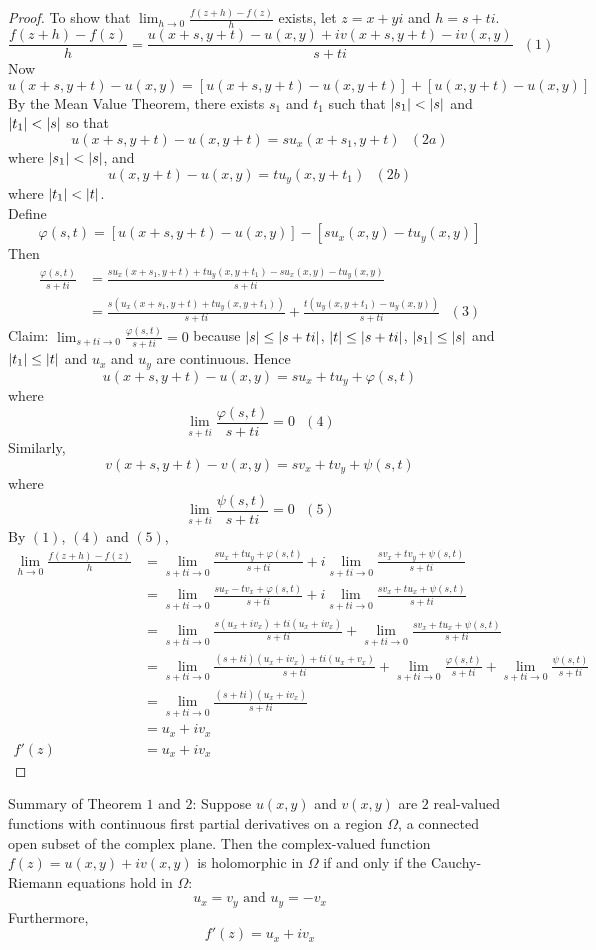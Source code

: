 \documentclass[12pt]{article}
\begin{document}
\begin{proof} To show that $\lim_{h\to 0} \frac{f(z+h) - f(z)}{h}$ exists, let $z =x+yi$ and $h=s+ti$. 
$$ \frac{f(z+h) - f(z)}{h} = \frac{u(x+s, y+t) - u(x,y) + iv(x+s,y+t) - iv(x,y)}{s+ti} ~~~(1)$$ 
Now $$ u(x+s,y+t) - u(x,y) = [u(x+s,y+t) - u(x,y+t)] + [u(x,y+t) - u(x,y)] $$ 
By the Mean Value Theorem, there exists $s_1$ and $t_1$ such that $\abs{s_1} < \abs{s}$ and $\abs{t_1} < \abs{s}$ so that 
$$u(x+s,y+t) - u(x,y+t) = su_x(x+s_1,y+t)~~~ (2a)$$ where $\abs{s_1} < \abs{s}$, and 
$$u(x,y+t) - u(x,y) = tu_y(x,y+t_1) ~~~ (2b)$$ where $\abs{t_1} < \abs{t}$. \\
Define $$ \varphi(s,t) = [u(x+s,y+t) - u(x,y)] - [su_x(x,y) - tu_y(x,y)] $$ Then 
$$ \begin{aligned} \frac{\varphi(s,t)}{s+ti} &= \frac{su_x(x+s_1,y+t) + tu_y(x,y+t_1) - su_x(x,y) - tu_y(x,y)}{s+ti} \\ &= \frac{s(u_x(x+s_1,y+t) + tu_y(x,y+t_1))}{s+ti} + \frac{t(u_y(x,y+t_1) - u_y(x,y))}{s+ti} ~~~(3) \end{aligned} $$ 
Claim: $\lim_{s+ti \to 0} \frac{\varphi(s,t)}{s+ti} = 0$ because $\abs{s} \leq \abs{s+ti}$, $\abs{t} \leq \abs{s+ti}$, $\abs{s_1} \leq \abs{s}$ and $\abs{t_1} \leq \abs{t}$ and $u_x$ and $u_y$ are continuous. Hence 
$$ u(x+s,y+t) - u(x,y) = su_x + tu_y + \varphi(s,t)$$ 
where $$\lim_{s+ti} \frac{\varphi(s,t)}{s+ti} = 0 ~~~(4) $$ 
Similarly, $$v(x+s, y+t)-v(x,y) = sv_x + tv_y + \psi(s,t)$$
 where $$\lim_{s+ti} \frac{\psi(s,t)}{s+ti} = 0 ~~~(5) $$ 
 By $(1)$, $(4)$ and $(5)$, 
 $$ \begin{aligned} \lim_{h\to 0} \frac{f(z+h) - f(z)}{h} &= \lim_{s+ti \to 0} \frac{su_x + tu_y + \varphi(s,t)}{s+ti} + i\lim_{s+ti \to 0} \frac{sv_x + tv_y + \psi(s,t)}{s+ti} \\ 
 &= \lim_{s+ti \to 0} \frac{su_x - tv_x + \varphi(s,t)}{s+ti} + i\lim_{s+ti \to 0} \frac{sv_x + tu_x + \psi(s,t)}{s+ti} \\ 
 &= \lim_{s+ti \to 0} \frac{s(u_x + iv_x) + ti(u_x + iv_x)}{s+ti} + \lim_{s+ti \to 0} \frac{sv_x + tu_x + \psi(s,t)}{s+ti} \\ &= \lim_{s+ti \to 0} \frac{(s+ti)(u_x + iv_x) + ti(u_x + v_x)}{s+ti} + \lim_{s+ti \to 0} \frac{\varphi(s,t)}{s+ti} + \lim_{s+ti \to 0} \frac{\psi(s,t)}{s+ti} \\ 
 &= \lim_{s+ti \to 0} \frac{(s+ti)(u_x + iv_x)}{s+ti} \\ &= u_x + iv_x \\ f'(z) &= u_x + iv_x \end{aligned} $$ \end{proof} 
 Summary of Theorem $1$ and $2$: Suppose $u(x,y)$ and $v(x,y)$ are $2$ real-valued functions with continuous first partial derivatives on a region $\Omega$, a connected open subset of the complex plane. Then the complex-valued function $f(z) = u(x,y) + iv(x,y)$ is holomorphic in $\Omega$ if and only if the Cauchy-Riemann equations hold in $\Omega$:
 $$u_x = v_y \text{ and } u_y = -v_x $$
 Furthermore, $$f'(z) = u_x + iv_x $$ 
 
\end{document}
